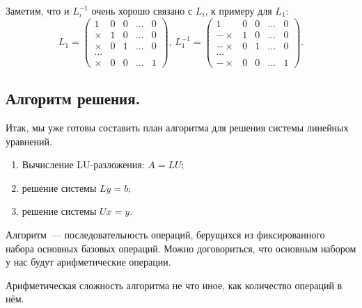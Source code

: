\begin{remark}
	Заметим, что и $L_{i}^{-1}$ очень хорошо связано с $L_{i}$, к примеру для $L_1$:
	\[
		L_1 = \left(
		\begin{array}{ccccc}
				1      & 0 & 0 & \ldots & 0 \\
				\times & 1 & 0 & \ldots & 0 \\
				\times & 0 & 1 & \ldots & 0 \\
				\ldots &                    \\
				\times & 0 & 0 & \ldots & 1
			\end{array}
		\right),\,
		L_1^{-1} = \left(
		\begin{array}{ccccc}
				1       & 0 & 0 & \ldots & 0 \\
				-\times & 1 & 0 & \ldots & 0 \\
				-\times & 0 & 1 & \ldots & 0 \\
				\ldots  &                    \\
				-\times & 0 & 0 & \ldots & 1
			\end{array}
		\right).
	\]
\end{remark}

\subsection{Алгоритм решения.}

Итак, мы уже готовы составить план алгоритма для решения системы линейных уравнений.

\begin{enumerate}[label=\protect\circled{\arabic*}]
	\item Вычисление LU-разложения: $A=LU$;
	\item решение системы $Ly=b$;
	\item решение системы $Ux=y$.
\end{enumerate}

\begin{definition}
	Алгоритм~--- последовательность операций, берущихся из фиксированного набора основных базовых
	операций. Можно договориться, что основным набором у нас будут арифметические операции.
\end{definition}

\begin{definition}
	Арифметическая сложность алгоритма не что иное, как количество операций в нём.
\end{definition}

